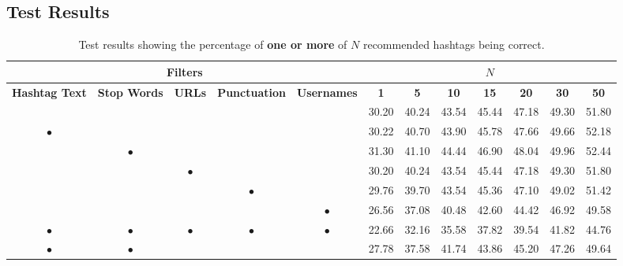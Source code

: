 \documentclass[11pt,a4paper]{report}
\renewcommand{\arraystretch}{1.5}
\begin{document}
\begin{subappendices}
\renewcommand{\arraystretch}{1.1}
\begin{landscape}
\section{Test Results}
\label{appendix:testresults}
\begin{table}[H]
    \centering
    \small
    \begin{tabular}{|c|c|c|c|c||c|c|c|c|c|c|c|}
        \hline
        \multicolumn{5}{|c||}{Filters} & \multicolumn{7}{|c|}{$N$} \\
        \hline
        \textbf{Hashtag Text} & \textbf{Stop Words} & \textbf{URLs} & \textbf{Punctuation} & \textbf{Usernames} & \textbf{1} & \textbf{5} & \textbf{10} & \textbf{15} & \textbf{20} & \textbf{30} & \textbf{50} \\
        \hline
        \hline
        & & & & & 30.20 & 40.24 & 43.54 & 45.44 & 47.18 & 49.30 & 51.80 \\
        \hline
        $\bullet$ & & & & & 30.22 & 40.70 & 43.90 & 45.78 & 47.66 & 49.66 & 52.18 \\
        \hline
        & $\bullet$ & & & & 31.30 & 41.10 & 44.44 & 46.90 & 48.04 & 49.96 & 52.44 \\
        \hline
        & & $\bullet$ & & & 30.20 & 40.24 & 43.54 & 45.44 & 47.18 & 49.30 & 51.80 \\
        \hline
        & & & $\bullet$ & & 29.76 & 39.70 & 43.54 & 45.36 & 47.10 & 49.02 & 51.42 \\
        \hline
        & & & & $\bullet$ & 26.56 & 37.08 & 40.48 & 42.60 & 44.42 & 46.92 & 49.58 \\
        \hline
        $\bullet$ & $\bullet$ & $\bullet$ & $\bullet$ & $\bullet$ & 22.66 & 32.16 & 35.58 & 37.82 & 39.54 & 41.82 & 44.76 \\
        \hline
        $\bullet$ & $\bullet$ & & & & 27.78 & 37.58 & 41.74 & 43.86 & 45.20 & 47.26 & 49.64 \\
        \hline
    \end{tabular}
    \caption*{Test results showing the percentage of \textbf{one or more} of $N$ recommended hashtags being correct.}
\end{table}


\end{landscape}
\end{subappendices}
\end{document}
